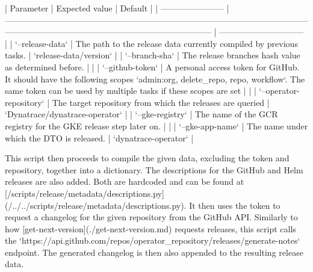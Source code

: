 | Parameter               | Expected value                                                                                                                                                                         | Default                        |
| ----------------------- | -------------------------------------------------------------------------------------------------------------------------------------------------------------------------------------- | ------------------------------ |
| `--release-data`        | The path to the release data currently compiled by previous tasks.                                                                                                                     | `release-data/version`         |
| `--branch-sha`          | The release branches hash value as determined before.                                                                                                                                  |                                |
| `--github-token`        | A personal access token for GitHub. It should have the following scopes `admin:org, delete_repo, repo, workflow`. The same token can be used by multiple tasks if these scopes are set |                                |
| `--operator-repository` | The target repository from which the releases are queried                                                                                                                              | `Dynatrace/dynatrace-operator` |
| `--gke-registry`        | The name of the GCR registry for the GKE release step later on.                                                                                                                        |                                |
| `--gke-app-name`        | The name under which the DTO is released.                                                                                                                                              | `dynatrace-operator`           |

This script then proceeds to compile the given data, excluding the token and repository, together into a dictionary.
The descriptions for the GitHub and Helm releases are also added.
Both are hardcoded and can be found at [/scripts/release/metadata/descriptions.py](/../../scripts/release/metadata/descriptions.py).
It then uses the token to request a changelog for the given repository from the GitHub API.
Similarly to how [get-next-version](./get-next-version.md) requests releases, this script calls the `https://api.github.com/repos/{operator_repository}/releases/generate-notes` endpoint.
The generated changelog is then also appended to the resulting release data.


